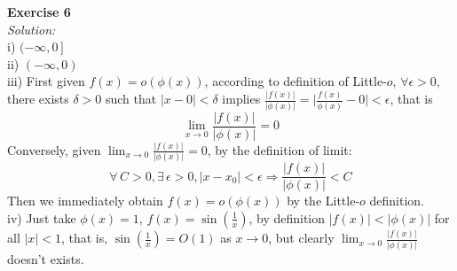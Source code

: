 \documentclass[12pt]{article}
\begin{document}
\textbf{Exercise 6}\\ 
\textit{Solution:}\\
i)\phantom{i} $(-\infty, 0\,]$\\
ii) $(-\infty, 0)$\\
iii) First given $f(x)=o(\phi(x))$, according to definition of Little-$o$,  $\forall\epsilon>0$, there exists $\delta>0$ such that $|x-0|<\delta$ implies $\displaystyle\frac{|f(x)|}{|\phi(x)|}=\bigl|\frac{f(x)}{\phi(x)}-0\bigr|<\epsilon$, that is
\[
\lim_{x\to 0}\frac{|f(x)|}{|\phi(x)|}=0
\]
Conversely, given $\displaystyle\lim_{x\to 0}\frac{|f(x)|}{|\phi(x)|}=0$, by the definition of limit:
\[
\forall\, C>0, \exists\,\epsilon>0, |x-x_0|<\epsilon \Rightarrow \frac{|f(x)|}{|\phi(x)|}<C
\]
Then we immediately obtain $f(x)=o(\phi(x))$ by the Little-$o$ definition.\\
iv) Just take $\phi(x)=1$, $f(x)=\sin(\frac{1}{x})$, by definition $|f(x)|<|\phi(x)|$ for all $|x|<1$,
that is, $\sin(\frac{1}{x})=O(1)$ as $x\to 0$, but clearly $\displaystyle \lim_{x\to 0}\frac{|f(x)|}{|\phi(x)|}$ doesn't exists.
\end{document}
